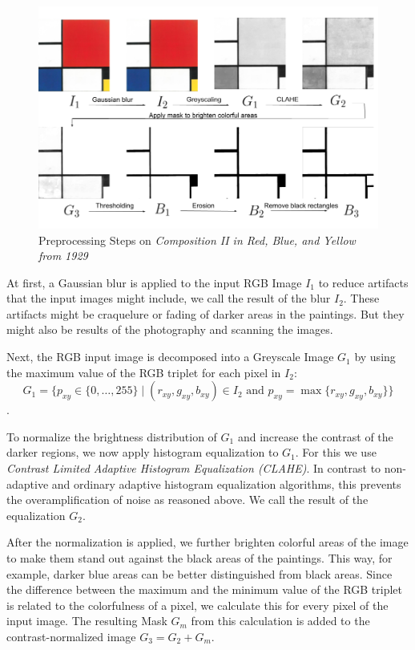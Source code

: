 \documentclass[serif,article,noparskip]{agse-thesis}
\begin{document}
\begin{figure}
  \includegraphics[width=\linewidth]{images/preprocessing_steps.png}
  \caption{Preprocessing Steps on \textit{Composition II in Red, Blue, and Yellow
  from 1929}}
  \label{fig:preprocessing}
\end{figure}

At first, a Gaussian blur is applied to the input RGB Image $I_1$ to reduce
artifacts that the input images might include, we call the result of the blur
$I_2$. These artifacts might be craquelure or fading of darker areas in the
paintings. But they might also be results of the photography and scanning the
images.

Next, the RGB input image is decomposed into a Greyscale Image $G_1$ by using
the maximum value of the RGB triplet for each pixel in $I_2$:
$$G_1 = \{p_{xy} \in \{0,\ldots,255\} \mid (r_{xy},g_{xy},b_{xy})\in I_2\text{ and }p_{xy}=\max\{r_{xy},g_{xy},b_{xy}\}\}$$.

To normalize the brightness distribution of $G_1$ and increase the contrast of
the darker regions, we now apply histogram equalization to $G_1$. For this we
use \textit{Contrast Limited Adaptive Histogram Equalization (CLAHE)}. In
contrast to non-adaptive and ordinary adaptive histogram equalization
algorithms, this prevents the overamplification of noise as reasoned above. We
call the result of the equalization $G_2$. \cite{Pizer1987}

After the normalization is applied, we further brighten colorful areas of the
image to make them stand out against the black areas of the paintings. This way,
for example, darker blue areas can be better distinguished from black areas.
Since the difference between the maximum and the minimum value of the RGB
triplet is related to the colorfulness of a pixel, we calculate this for every
pixel of the input image. The resulting Mask $G_m$ from this calculation is added to
the contrast-normalized image $G_3 = G_2 + G_m$.
\end{document}
